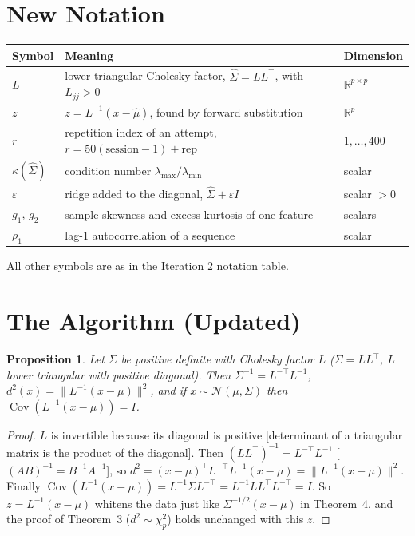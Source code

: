 \documentclass[11pt]{article}
\newcommand{\R}{\mathbb{R}}
\newcommand{\Cov}{\operatorname{Cov}}
\newcommand{\T}{^{\top}}
\newcommand{\hSigma}{\hat{\Sigma}}
\newcommand{\hmu}{\hat{\mu}}
\newcommand{\norm}[1]{\lVert #1\rVert}
\theoremstyle{plain}
\newtheorem{proposition}{Proposition}
\begin{document}
\section{New Notation}
\begin{table}[H]
\centering\small
\begin{tabular}{@{}l p{9.2cm} l@{}}
\toprule
Symbol & Meaning & Dimension\\
\midrule
$L$ & lower-triangular Cholesky factor, $\hSigma=LL\T$, with $L_{jj}>0$ & $\R^{p\times p}$\\
$z$ & $z=L^{-1}(x-\hmu)$, found by forward substitution & $\R^{p}$\\
$r$ & repetition index of an attempt, $r=50(\text{session}-1)+\text{rep}$ & $1,\dots,400$\\
$\kappa(\hSigma)$ & condition number $\lambda_{\max}/\lambda_{\min}$ & scalar\\
$\varepsilon$ & ridge added to the diagonal, $\hSigma+\varepsilon I$ & scalar $>0$\\
$g_1$, $g_2$ & sample skewness and excess kurtosis of one feature & scalars\\
$\rho_1$ & lag-1 autocorrelation of a sequence & scalar\\
\bottomrule
\end{tabular}
\end{table}
All other symbols are as in the Iteration 2 notation table.

\section{The Algorithm (Updated)}\label{sec:algo}

\begin{proposition}\label{prop:chol}
Let $\Sigma$ be positive definite with Cholesky factor $L$ ($\Sigma=LL\T$, $L$ lower
triangular with positive diagonal). Then $\Sigma^{-1}=L^{-\top}L^{-1}$,
$d^2(x)=\norm{L^{-1}(x-\mu)}^2$, and if $x\sim\mathcal N(\mu,\Sigma)$ then
$\Cov(L^{-1}(x-\mu))=I$.
\end{proposition}
\begin{proof}
$L$ is invertible because its diagonal is positive [determinant of a triangular
matrix is the product of the diagonal]. Then
$(LL\T)^{-1}=L^{-\top}L^{-1}$ [$(AB)^{-1}=B^{-1}A^{-1}$], so
$d^2=(x-\mu)\T L^{-\top}L^{-1}(x-\mu)=\norm{L^{-1}(x-\mu)}^2$. Finally
$\Cov(L^{-1}(x-\mu))=L^{-1}\Sigma L^{-\top}=L^{-1}LL\T L^{-\top}=I$. So $z=L^{-1}(x-\mu)$
whitens the data just like $\Sigma^{-1/2}(x-\mu)$ in Theorem~4, and the proof of
Theorem~3 ($d^2\sim\chi^2_p$) holds unchanged with this $z$.
\end{proof}
\end{document}
